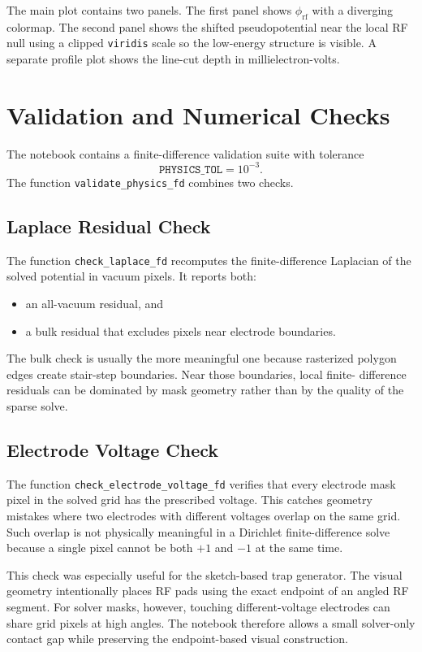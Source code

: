 \documentclass[11pt]{article}
\begin{document}
The main plot contains two panels. The first panel shows \(\phi_{\mathrm{rf}}\)
with a diverging colormap. The second panel shows the shifted pseudopotential
near the local RF null using a clipped \texttt{viridis} scale so the low-energy
structure is visible. A separate profile plot shows the line-cut depth in
millielectron-volts.

\newpage

\section{Validation and Numerical Checks}

The notebook contains a finite-difference validation suite with tolerance
\[
  \texttt{PHYSICS\_TOL} = 10^{-3}.
\]
The function \texttt{validate\_physics\_fd} combines two checks.

\subsection{Laplace Residual Check}

The function \texttt{check\_laplace\_fd} recomputes the finite-difference
Laplacian of the solved potential in vacuum pixels. It reports both:
\begin{itemize}
  \item an all-vacuum residual, and
  \item a bulk residual that excludes pixels near electrode boundaries.
\end{itemize}
The bulk check is usually the more meaningful one because rasterized polygon
edges create stair-step boundaries. Near those boundaries, local finite-
difference residuals can be dominated by mask geometry rather than by the
quality of the sparse solve.

\subsection{Electrode Voltage Check}

The function \texttt{check\_electrode\_voltage\_fd} verifies that every
electrode mask pixel in the solved grid has the prescribed voltage. This catches
geometry mistakes where two electrodes with different voltages overlap on the
same grid. Such overlap is not physically meaningful in a Dirichlet
finite-difference solve because a single pixel cannot be both \(+1\) and
\(-1\) at the same time.

This check was especially useful for the sketch-based trap generator. The
visual geometry intentionally places RF pads using the exact endpoint of an
angled RF segment. For solver masks, however, touching different-voltage
electrodes can share grid pixels at high angles. The notebook therefore allows
a small solver-only contact gap while preserving the endpoint-based visual
construction.
\end{document}
